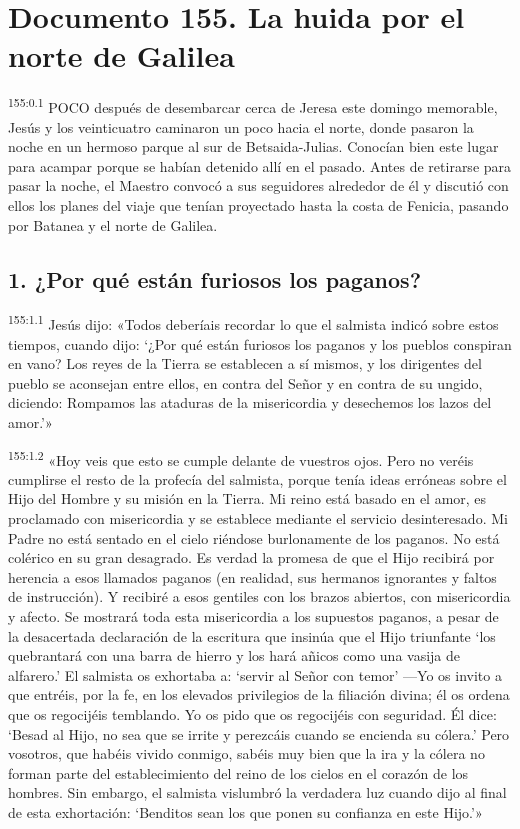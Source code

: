 \chapter{Documento 155. La huida por el norte de Galilea}
\par 
\textsuperscript{155:0.1} POCO después de desembarcar cerca de Jeresa este domingo memorable, Jesús y los veinticuatro caminaron un poco hacia el norte, donde pasaron la noche en un hermoso parque al sur de Betsaida-Julias. Conocían bien este lugar para acampar porque se habían detenido allí en el pasado. Antes de retirarse para pasar la noche, el Maestro convocó a sus seguidores alrededor de él y discutió con ellos los planes del viaje que tenían proyectado hasta la costa de Fenicia, pasando por Batanea y el norte de Galilea.

\section*{1. ¿Por qué están furiosos los paganos?}
\par 
\textsuperscript{155:1.1} Jesús dijo: «Todos deberíais recordar lo que el salmista indicó sobre estos tiempos, cuando dijo: `¿Por qué están furiosos los paganos y los pueblos conspiran en vano? Los reyes de la Tierra se establecen a sí mismos, y los dirigentes del pueblo se aconsejan entre ellos, en contra del Señor y en contra de su ungido, diciendo: Rompamos las ataduras de la misericordia y desechemos los lazos del amor.'»

\par 
\textsuperscript{155:1.2} «Hoy veis que esto se cumple delante de vuestros ojos. Pero no veréis cumplirse el resto de la profecía del salmista, porque tenía ideas erróneas sobre el Hijo del Hombre y su misión en la Tierra. Mi reino está basado en el amor, es proclamado con misericordia y se establece mediante el servicio desinteresado. Mi Padre no está sentado en el cielo riéndose burlonamente de los paganos. No está colérico en su gran desagrado. Es verdad la promesa de que el Hijo recibirá por herencia a esos llamados paganos (en realidad, sus hermanos ignorantes y faltos de instrucción). Y recibiré a esos gentiles con los brazos abiertos, con misericordia y afecto. Se mostrará toda esta misericordia a los supuestos paganos, a pesar de la desacertada declaración de la escritura que insinúa que el Hijo triunfante `los quebrantará con una barra de hierro y los hará añicos como una vasija de alfarero.' El salmista os exhortaba a: `servir al Señor con temor' ---Yo os invito a que entréis, por la fe, en los elevados privilegios de la filiación divina; él os ordena que os regocijéis temblando. Yo os pido que os regocijéis con seguridad. Él dice: `Besad al Hijo, no sea que se irrite y perezcáis cuando se encienda su cólera.' Pero vosotros, que habéis vivido conmigo, sabéis muy bien que la ira y la cólera no forman parte del establecimiento del reino de los cielos en el corazón de los hombres. Sin embargo, el salmista vislumbró la verdadera luz cuando dijo al final de esta exhortación: `Benditos sean los que ponen su confianza en este Hijo.'»

